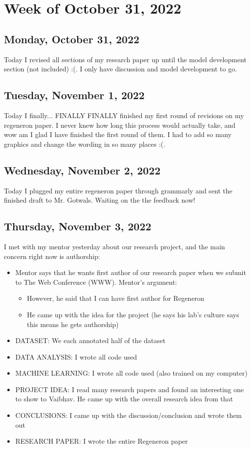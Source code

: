 \documentclass[11pt,letterpaper]{article}
\begin{document}
\section{Week of October 31, 2022}
\subsection{Monday, October 31, 2022}
Today I revised all sections of my research paper up until the model development section (not included) :(. I only have discussion and model development to go.

\subsection{Tuesday, November 1, 2022}
Today I finally... FINALLY FINALLY finished my first round of revisions on my regeneron paper. I never knew how long this process would actually take, and wow am I glad I have finished the first round of them. I had to add so many graphics and change the wording in so many places :(.

\subsection{Wednesday, November 2, 2022}
Today I plugged my entire regeneron paper through grammarly and sent the finished draft to Mr. Gotwals. Waiting on the the feedback now!

\subsection{Thursday, November 3, 2022}
I met with my mentor yesterday about our research project, and the main concern right now is authorship:
\begin{itemize}
    \item Mentor says that he wants first author of our research paper when we submit to The Web Conference (WWW). Mentor's argument:
    \begin{itemize}
        \item However, he said that I can have first author for Regeneron
        \item He came up with the idea for the project (he says his lab's culture says this means he gets authorship)
    \end{itemize}
    \item DATASET: We each annotated half of the dataset
    \item DATA ANALYSIS: I wrote all code used 
    \item MACHINE LEARNING: I wrote all code used (also trained on my computer)
    \item PROJECT IDEA: I read many research papers and found an interesting one to show to Vaibhav. He came up with the overall research idea from that
    \item CONCLUSIONS: I came up with the discussion/conclusion and wrote them out
    \item RESEARCH PAPER: I wrote the entire Regeneron paper
\end{itemize}
\end{document}
